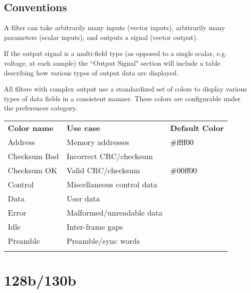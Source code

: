 \subsection{Conventions}

A filter can take arbitrarily many inputs (vector inputs), arbitrarily many parameters (scalar inputs), and outputs a
signal (vector output).

If the output signal is a multi-field type (as opposed to a single scalar, e.g. voltage, at each sample) the
``Output Signal" section will include a table describing how various types of output data are displayed.

All filters with complex output use a standardized set of colors to display various types of data fields in a
consistent manner. These colors are configurable under the  preferences category.

\begin{tabularx}{16cm}{llX}
\thickhline
\textbf{Color name} & \textbf{Use case} & \textbf{Default Color} \\
\thickhline
Address & Memory addresses & \cellcolor{address}\textcolor{black}{\#ffff00} \\
\thinhline
Checksum Bad & Incorrect CRC/checksum & \cellcolor{checksumbad}\textcolor{white}{\#ff0000} \\
\thinhline
Checksum OK & Valid CRC/checksum & \cellcolor{checksumok}\textcolor{black}{\#00ff00} \\
\thinhline
Control & Miscellaneous control data & \cellcolor{control}\textcolor{white}{\#c000a0} \\
\thinhline
Data & User data & \cellcolor{data}\textcolor{white}{\#336699} \\
\thinhline
Error & Malformed/unreadable data & \cellcolor{error}\textcolor{white}{\#ff0000} \\
\thinhline
Idle & Inter-frame gaps & \cellcolor{idle}\textcolor{white}{\#404040} \\
\thinhline
Preamble & Preamble/sync words & \cellcolor{preamble}\textcolor{white}{\#808080} \\
\thickhline
\end{tabularx}

\pagebreak
\section{128b/130b}
\label{filter:128b130b}

